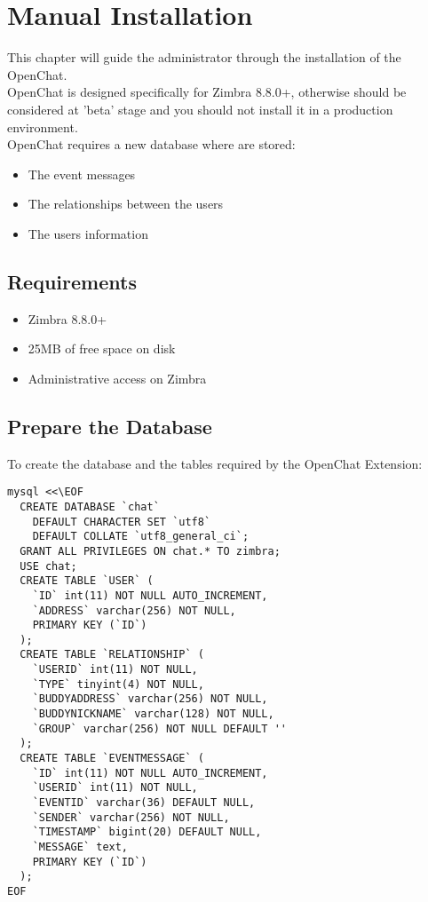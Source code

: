 \chapter{Manual Installation}

\noindent This chapter will guide the administrator through the installation of the OpenChat.\\

\noindent OpenChat is designed specifically for Zimbra 8.8.0+, otherwise should be considered at 'beta' stage and you should not install it in a production environment.\\

\noindent OpenChat requires a new database where are stored:
\begin{itemize}
\item The event messages
\item The relationships between the users
\item The users information
\end{itemize}

\section{Requirements}

\begin{itemize}
\item Zimbra 8.8.0+
\item 25MB of free space on disk
\item Administrative access on Zimbra
\end{itemize}

\section{Prepare the Database}
To create the database and the tables required by the OpenChat Extension:
\begin{verbatim}
mysql <<\EOF
  CREATE DATABASE `chat`
    DEFAULT CHARACTER SET `utf8`
    DEFAULT COLLATE `utf8_general_ci`;
  GRANT ALL PRIVILEGES ON chat.* TO zimbra;
  USE chat;
  CREATE TABLE `USER` (
    `ID` int(11) NOT NULL AUTO_INCREMENT,
    `ADDRESS` varchar(256) NOT NULL,
    PRIMARY KEY (`ID`)
  );
  CREATE TABLE `RELATIONSHIP` (
    `USERID` int(11) NOT NULL,
    `TYPE` tinyint(4) NOT NULL,
    `BUDDYADDRESS` varchar(256) NOT NULL,
    `BUDDYNICKNAME` varchar(128) NOT NULL,
    `GROUP` varchar(256) NOT NULL DEFAULT ''
  );
  CREATE TABLE `EVENTMESSAGE` (
    `ID` int(11) NOT NULL AUTO_INCREMENT,
    `USERID` int(11) NOT NULL,
    `EVENTID` varchar(36) DEFAULT NULL,
    `SENDER` varchar(256) NOT NULL,
    `TIMESTAMP` bigint(20) DEFAULT NULL,
    `MESSAGE` text,
    PRIMARY KEY (`ID`)
  );
EOF
\end{verbatim}

